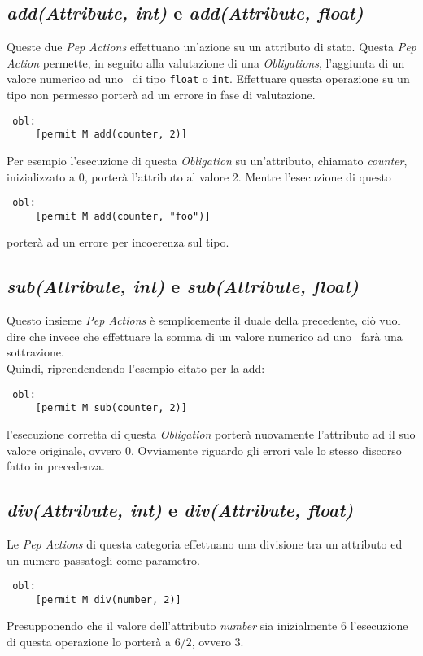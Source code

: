 \subsection*{\textit{add(Attribute, int)} e \textit{add(Attribute, float)}} %
\label{ssub:opadd}
Queste due \textit{Pep Actions} effettuano un'azione su un attributo di stato. Questa \textit{Pep Action} permette, in seguito alla valutazione di una \textit{Obligations}, l'aggiunta di un valore numerico ad uno \statusattribute \ di tipo \texttt{float} o \texttt{int}. Effettuare questa operazione su un tipo non permesso porterà ad un errore in fase di valutazione.
\begin{verbatim}
 obl:
     [permit M add(counter, 2)]
\end{verbatim}
Per esempio l'esecuzione di questa \textit{Obligation} su un'attributo, chiamato \textit{counter}, inizializzato a 0, porterà l'attributo al valore 2.
Mentre l'esecuzione di questo
\begin{verbatim}
 obl:
     [permit M add(counter, "foo")]
\end{verbatim}
porterà ad un errore per incoerenza sul tipo.
\subsection*{\textit{sub(Attribute, int)} e \textit{sub(Attribute, float)}} %
\label{ssub:opsub}
Questo insieme \textit{Pep Actions} è semplicemente il duale della precedente, ciò vuol dire che invece che effettuare la somma di un valore numerico ad uno \statusattribute \ farà una sottrazione.\\
Quindi, riprendendendo l'esempio citato per la add:
\begin{verbatim}
 obl:
     [permit M sub(counter, 2)]
\end{verbatim}
l'esecuzione corretta di questa \textit{Obligation} porterà nuovamente l'attributo ad il suo valore originale, ovvero 0. Ovviamente riguardo gli errori vale lo stesso discorso fatto in precedenza.

\subsection*{\textit{div(Attribute, int)} e \textit{div(Attribute, float)}} %
\label{ssub:opdiv}
Le \textit{Pep Actions} di questa categoria effettuano una divisione tra un attributo ed un numero passatogli come parametro.
\begin{verbatim}
 obl:
     [permit M div(number, 2)]
\end{verbatim}
Presupponendo che il valore dell'attributo \textit{number} sia inizialmente 6 l'esecuzione di questa operazione lo porterà a $6/2$, ovvero 3.

